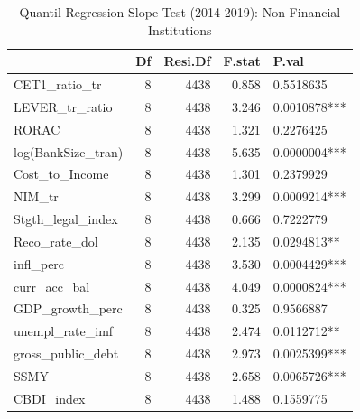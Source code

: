 \begin{table}[ht]
\centering
\caption{Quantil Regression-Slope Test (2014-2019): Non-Financial Institutions} 
\begingroup\small
\begin{tabular}{lrrrl}
  \toprule
 & Df & Resi.Df & F.stat & P.val \\ 
  \midrule
CET1\_ratio\_tr & 8 & 4438 & 0.858 & 0.5518635 \\ 
  LEVER\_tr\_ratio & 8 & 4438 & 3.246 & 0.0010878*** \\ 
  RORAC & 8 & 4438 & 1.321 & 0.2276425 \\ 
  log(BankSize\_tran) & 8 & 4438 & 5.635 & 0.0000004*** \\ 
  Cost\_to\_Income & 8 & 4438 & 1.301 & 0.2379929 \\ 
  NIM\_tr & 8 & 4438 & 3.299 & 0.0009214*** \\ 
  Stgth\_legal\_index & 8 & 4438 & 0.666 & 0.7222779 \\ 
  Reco\_rate\_dol & 8 & 4438 & 2.135 & 0.0294813** \\ 
  infl\_perc & 8 & 4438 & 3.530 & 0.0004429*** \\ 
  curr\_acc\_bal & 8 & 4438 & 4.049 & 0.0000824*** \\ 
  GDP\_growth\_perc & 8 & 4438 & 0.325 & 0.9566887 \\ 
  unempl\_rate\_imf & 8 & 4438 & 2.474 & 0.0112712** \\ 
  gross\_public\_debt & 8 & 4438 & 2.973 & 0.0025399*** \\ 
  SSMY & 8 & 4438 & 2.658 & 0.0065726*** \\ 
  CBDI\_index & 8 & 4438 & 1.488 & 0.1559775 \\ 
   \bottomrule
\end{tabular}
\endgroup
\end{table}
